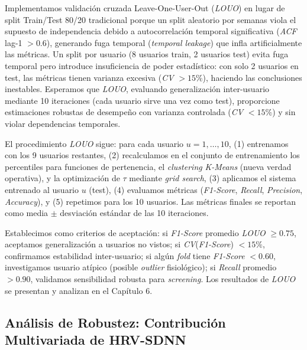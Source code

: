 Implementamos validación cruzada Leave-One-User-Out (\textit{LOUO}) en lugar de split Train/Test 80/20 tradicional porque un split aleatorio por semanas viola el supuesto de independencia debido a autocorrelación temporal significativa (\textit{ACF} lag-1 $> 0.6$), generando fuga temporal (\textit{temporal leakage}) que infla artificialmente las métricas. Un split por usuario (8 usuarios train, 2 usuarios test) evita fuga temporal pero introduce insuficiencia de poder estadístico: con solo 2 usuarios en test, las métricas tienen varianza excesiva (\textit{CV} $> 15\%$), haciendo las conclusiones inestables. Esperamos que \textit{LOUO}, evaluando generalización inter-usuario mediante 10 iteraciones (cada usuario sirve una vez como test), proporcione estimaciones robustas de desempeño con varianza controlada (\textit{CV} $< 15\%$) y sin violar dependencias temporales.

El procedimiento \textit{LOUO} sigue: para cada usuario $u = 1, \ldots, 10$, (1) entrenamos con los 9 usuarios restantes, (2) recalculamos en el conjunto de entrenamiento los percentiles para funciones de pertenencia, el \textit{clustering} \textit{K-Means} (nueva verdad operativa), y la optimización de $\tau$ mediante \textit{grid search}, (3) aplicamos el sistema entrenado al usuario $u$ (test), (4) evaluamos métricas (\textit{F1-Score}, \textit{Recall}, \textit{Precision}, \textit{Accuracy}), y (5) repetimos para los 10 usuarios. Las métricas finales se reportan como media $\pm$ desviación estándar de las 10 iteraciones.

Establecimos como criterios de aceptación: si \textit{F1-Score} promedio \textit{LOUO} $\geq 0.75$, aceptamos generalización a usuarios no vistos; si \textit{CV}(\textit{F1-Score}) $< 15\%$, confirmamos estabilidad inter-usuario; si algún \textit{fold} tiene \textit{F1-Score} $< 0.60$, investigamos usuario atípico (posible \textit{outlier} fisiológico); si \textit{Recall} promedio $> 0.90$, validamos sensibilidad robusta para \textit{screening}. Los resultados de \textit{LOUO} se presentan y analizan en el Capítulo 6.

\FloatBarrier

\subsection{Análisis de Robustez: Contribución Multivariada de HRV-SDNN}

